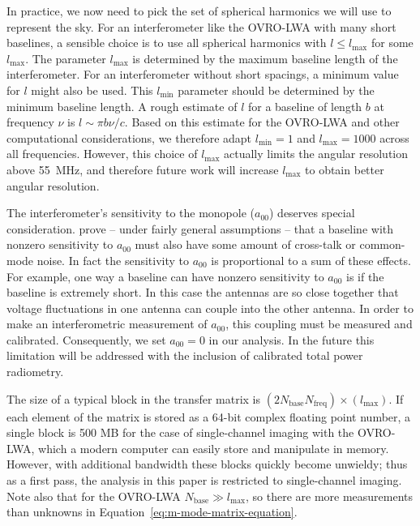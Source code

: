 \documentclass[twocolumn]{aastex61}
\begin{document}
In practice, we now need to pick the set of spherical harmonics we will use to represent the sky.
For an interferometer like the OVRO-LWA with many short baselines, a sensible choice is to use all
spherical harmonics with $l\le l_\text{max}$ for some $l_\text{max}$. The parameter $l_\text{max}$
is determined by the maximum baseline length of the interferometer.  For an interferometer without
short spacings, a minimum value for $l$ might also be used. This $l_\text{min}$ parameter should be
determined by the minimum baseline length. A rough estimate of $l$ for a baseline of length $b$ at
frequency $\nu$ is $l \sim \pi b\nu/c$. Based on this estimate for the OVRO-LWA and other
computational considerations, we therefore adapt $l_\text{min}=1$ and $l_\text{max}=1000$ across all
frequencies. However, this choice of $l_\text{max}$ actually limits the angular resolution above
55~MHz, and therefore future work will increase $l_\text{max}$ to obtain better angular resolution.

The interferometer's sensitivity to the monopole ($a_{00}$) deserves special consideration.
\citet{2016ApJ...826..116V} prove -- under fairly general assumptions -- that a baseline with
nonzero sensitivity to $a_{00}$ must also have some amount of cross-talk or common-mode noise.  In
fact the sensitivity to $a_{00}$ is proportional to a sum of these effects. For example, one way a
baseline can have nonzero sensitivity to $a_{00}$ is if the baseline is extremely short. In this
case the antennas are so close together that voltage fluctuations in one antenna can couple into the
other antenna. In order to make an interferometric measurement of $a_{00}$, this coupling must be
measured and calibrated. Consequently, we set $a_{00}=0$ in our analysis. In the future this
limitation will be addressed with the inclusion of calibrated total power radiometry.

The size of a typical block in the transfer matrix is
$(2N_\text{base}N_\text{freq})\times(l_\text{max})$. If each element of the matrix is stored as a
64-bit complex floating point number, a single block is 500 MB for the case of single-channel
imaging with the OVRO-LWA, which a modern computer can easily store and manipulate in memory.
However, with additional bandwidth these blocks quickly become unwieldy; thus as a first pass, the
analysis in this paper is restricted to single-channel imaging. Note also that for the OVRO-LWA
$N_\text{base} \gg l_\text{max}$, so there are more measurements than unknowns in
Equation~\ref{eq:m-mode-matrix-equation}.
\end{document}
